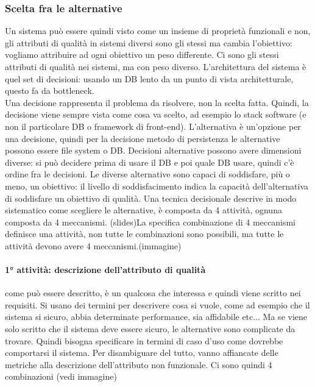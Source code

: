 \documentclass{article}
\begin{document}
\subsubsection{Scelta fra le alternative}
Un sistema può essere quindi visto come un insieme di proprietà funzionali e non, gli attributi di qualità in sistemi diversi sono gli stessi ma cambia l'obiettivo: vogliamo attribuire ad ogni obiettivo un peso differente. Ci sono gli stessi attributi di qualità nei sistemi, ma con peso diverso. L'architettura del sistema è quel set di decisioni: usando un DB lento da un punto di vista architetturale, questo fa da bottleneck.\\ Una decisione rappresenta il problema da risolvere, non la scelta fatta. Quindi, la decisione viene sempre vista come cosa va scelto, ad esempio lo stack software (e non il particolare DB o framework di front-end). L'alternativa è un'opzione per una decisione, quindi per la decisione metodo di persistenza le alternative possono essere file system o DB. Decisioni alternative possono avere dimensioni diverse: si può decidere prima di usare il DB e poi quale DB usare, quindi c'è ordine fra le decisioni. Le diverse alternative sono capaci di soddisfare, più o meno, un obiettivo: il livello di soddisfacimento indica la capacità dell'alternativa di soddisfare un obiettivo di qualità. Una tecnica decisionale descrive in modo sistematico come scegliere le alternative, è composta da 4 attività, ognuna composta da 4 meccanismi. (slides)La specifica combinazione di 4 meccanismi definisce una attività, non tutte le combinazioni sono possibili, ma tutte le attività devono avere 4 meccanismi.(immagine)\\ 
\paragraph{1° attività: descrizione dell'attributo di qualità}come può essere descritto, è un qualcosa che interessa e quindi viene scritto nei requisiti. Si usano dei termini per descrivere cosa si vuole, come ad esempio che il sistema si sicuro, abbia determinate performance, sia affidabile etc... Ma se viene solo scritto che il sistema deve essere sicuro, le alternative sono complicate da trovare. Quindi bisogna specificare in termini di caso d'uso come dovrebbe comportarsi il sistema. Per disambiguare del tutto, vanno affiancate delle metriche alla descrizione dell'attributo non funzionale. Ci sono quindi 4 combinazioni (vedi immagine)
\end{document}
